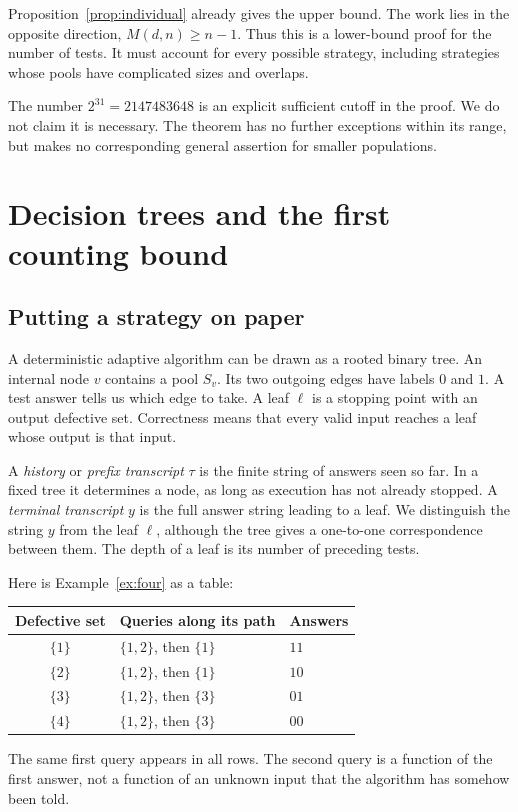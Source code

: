 \documentclass[11pt]{article}
\theoremstyle{definition}
\theoremstyle{remark}
\numberwithin{equation}{section}
\begin{document}
Proposition~\ref{prop:individual} already gives the upper bound.
The work lies in the opposite direction, \(M(d,n)\ge n-1\).
Thus this is a lower-bound proof for the number of tests. It must
account for every possible strategy, including strategies whose pools
have complicated sizes and overlaps.

The number \(2^{31}=2147483648\) is an explicit sufficient cutoff in
the proof. We do not claim it is necessary. The theorem has no further
exceptions within its range, but makes no corresponding general
assertion for smaller populations.

\section{Decision trees and the first counting bound}\label{sec:trees}

\subsection{Putting a strategy on paper}

A deterministic adaptive algorithm can be drawn as a rooted binary
tree. An internal node \(v\) contains a pool \(S_v\). Its two outgoing
edges have labels \(0\) and \(1\). A test answer tells us which edge
to take. A leaf \(\ell\) is a stopping point with an output defective
set. Correctness means that every valid input reaches a leaf whose
output is that input.

A \emph{history} or \emph{prefix transcript} \(\tau\) is the finite
string of answers seen so far. In a fixed tree it determines a node,
as long as execution has not already stopped. A \emph{terminal
transcript} \(y\) is the full answer string leading to a leaf.
We distinguish the string \(y\) from the leaf \(\ell\), although the
tree gives a one-to-one correspondence between them.
The depth of a leaf is its number of preceding tests.

Here is Example~\ref{ex:four} as a table:
\begin{center}
\begin{tabular}{cll}
\toprule
Defective set&Queries along its path&Answers\\
\midrule
\(\{1\}\)&\(\{1,2\}\), then \(\{1\}\)&\(11\)\\
\(\{2\}\)&\(\{1,2\}\), then \(\{1\}\)&\(10\)\\
\(\{3\}\)&\(\{1,2\}\), then \(\{3\}\)&\(01\)\\
\(\{4\}\)&\(\{1,2\}\), then \(\{3\}\)&\(00\)\\
\bottomrule
\end{tabular}
\end{center}
The same first query appears in all rows. The second query is a
function of the first answer, not a function of an unknown input
that the algorithm has somehow been told.
\end{document}
